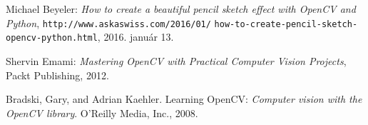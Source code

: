 \begin{thebibliography}{x}
 Michael Beyeler: \emph{How to create a beautiful pencil sketch effect with OpenCV and Python}, \texttt{http://www.askaswiss.com/2016/01/} \texttt{how-to-create-pencil-sketch-opencv-python.html}, 2016. január 13.

 Shervin Emami: \emph{Mastering OpenCV with Practical Computer Vision Projects}, Packt Publishing, 2012.

Bradski, Gary, and Adrian Kaehler. Learning OpenCV: \emph{Computer vision with the OpenCV library}. O'Reilly Media, Inc., 2008.


\end{thebibliography}